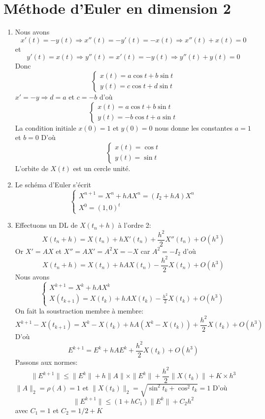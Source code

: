 \documentclass[a4paper]{article}
\begin{document}
\section{Méthode d'Euler en dimension 2}
\begin{enumerate}
\item Nous avons 
\[x'(t)=-y(t)\Longrightarrow x''(t)=-y'(t)=-x(t)\Longrightarrow x''(t)+x(t)=0\]
et 
\[y'(t)=x(t)\Longrightarrow y''(t)=x'(t)=-y(t)\Longrightarrow y''(t)+y(t)=0\]
Donc
\[\left\{\begin{array}{l}
x(t)=a\cos t+b\sin t\\
y(t)=c\cos t+d\sin t
\end{array}\right.\]
 $x'=-y \Longrightarrow d=a$ et $c=-b$ d'où
 \[\left\{\begin{array}{l}
x(t)=a\cos t+b\sin t\\
y(t)=-b\cos t+a\sin t
\end{array}\right.\]
La condition initiale $x(0)=1$ et $y(0)=0$ nous donne les constantes $a=1$ et $b=0$
D'où
 \[\left\{\begin{array}{l}
x(t)=\cos t\\
y(t)=\sin t
\end{array}\right.\]
L'orbite de $X(t)$ est un cercle unité.
\item Le schéma d'Euler s'écrit
 \[\left\{\begin{array}{l}
X^{n+1}=X^n+hAX^n=(I_2+hA)X^n\\
X^0=(1,0)^t
\end{array}\right.\]
\item Effectuons un DL de $X(t_n+h)$ à l'ordre 2:
\[X(t_n+h)=X(t_n)+hX'(t_n)+\frac{h^2}{2}X''(t_n)+O(h^3)\]
Or $X'=AX$ et $X''=AX'=A^2X=-X$ car $A^2=-I_2$ d'où
\[X(t_n+h)=X(t_n)+hAX(t_n)-\frac{h^2}{2}X(t_n)+O(h^3)\]
Nous avons
 \[\left\{\begin{array}{l}
X^{k+1}=X^k+hAX^k\\
X(t_{k+1})=X(t_k)+hAX(t_k)-\frac{h^2}{2}X(t_k)+O(h^3)
\end{array}\right.\]
On fait la soustraction membre à membre:
\[X^{k+1}-X(t_{k+1})=X^k-X(t_k)+hA\left(X^k-X(t_k)\right)+\frac{h^2}{2}X(t_k)+O(h^3)\]
D'où
\[E^{k+1}=E^k+hAE^k+\frac{h^2}{2}X(t_k)+O(h^3)\]
Passons aux normes:
\[\|E^{k+1}\|\leq \|E^k\|+h\|A\|\times \|E^k\|+\frac{h^2}{2}\|X(t_k)\|+K\times h^3\]
$\|A\|_2= \rho(A)=1$ et $\|X(t_k)\|_2=\sqrt{\sin^2t_k+\cos^2t_k}=1$
D'où
\[\|E^{k+1}\|\leq (1+h C_1)\|E^k\|+C_2h^2\]
avec $C_1=1$ et $C_2=1/2+K$


\end{enumerate}
\end{document}
